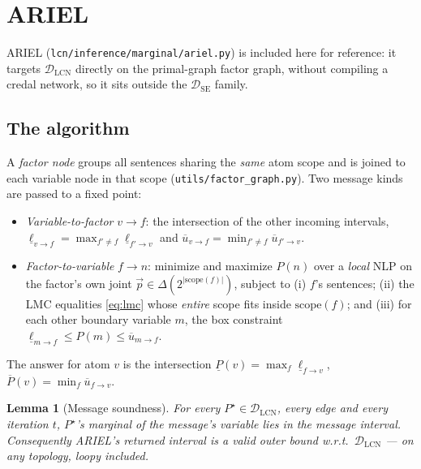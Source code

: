 \documentclass[11pt]{article}
\newtheorem{lemma}{Lemma}
\theoremstyle{definition}
\newcommand{\lo}{\underline}
\newcommand{\hi}{\overline}
\newcommand{\DSE}{\mathcal{D}_{\mathrm{SE}}}
\newcommand{\DLCN}{\mathcal{D}_{\mathrm{LCN}}}
\begin{document}
\section{ARIEL}\label{sec:ariel}

ARIEL (\texttt{lcn/inference/marginal/ariel.py}) is included here for reference: it targets $\DLCN$
directly on the primal-graph factor graph, without compiling a credal network, so it sits outside the
$\DSE$ family.

\subsection{The algorithm}
A \emph{factor node} groups all sentences sharing the \emph{same} atom scope and is joined to each
variable node in that scope (\texttt{utils/factor\_graph.py}). Two message kinds are passed to a
fixed point:
\begin{itemize}
  \item \emph{Variable-to-factor} $v\!\to\!f$: the intersection of the other incoming intervals,
    $\lo\ell_{v\to f}=\max_{f'\ne f}\lo\ell_{f'\to v}$ and
    $\hi u_{v\to f}=\min_{f'\ne f}\hi u_{f'\to v}$.
  \item \emph{Factor-to-variable} $f\!\to\!n$: minimize and maximize $P(n)$ over a \emph{local} NLP on
    the factor's own joint $\vec p\in\Delta(2^{|\mathrm{scope}(f)|})$, subject to (i) $f$'s sentences;
    (ii) the LMC equalities \eqref{eq:lmc} whose \emph{entire} scope fits inside
    $\mathrm{scope}(f)$; and (iii) for each other boundary variable $m$, the box constraint
    $\lo\ell_{m\to f}\le P(m)\le\hi u_{m\to f}$.
\end{itemize}
The answer for atom $v$ is the intersection $\lo P(v)=\max_f\lo\ell_{f\to v}$,
$\hi P(v)=\min_f\hi u_{f\to v}$.

\begin{lemma}[Message soundness]\label{lem:arielsound}
For every $P^\star\in\DLCN$, every edge and every iteration $t$, $P^\star$'s marginal of the message's
variable lies in the message interval. Consequently ARIEL's returned interval is a valid \emph{outer}
bound w.r.t.\ $\DLCN$ --- on \emph{any} topology, loopy included.
\end{lemma}
\end{document}
